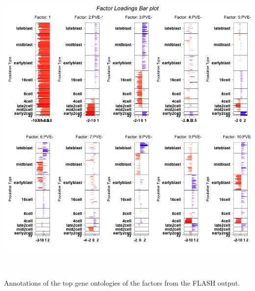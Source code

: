 \documentclass[12pt]{article}\usepackage[]{graphicx}\usepackage[usenames,dvipsnames]{color}
\newenvironment{knitrout}{}{} %
\begin{document}
\begin{knitrout}
\includegraphics[width=6in,height=6in]{figure/flash_multipanel_grid-1} 

\end{knitrout}


Annotations of the top gene ontologies of the factors from the FLASH output.
\end{document}
